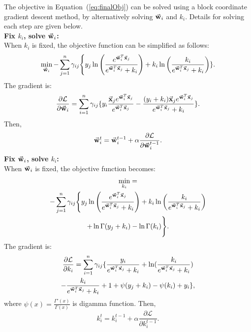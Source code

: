 The objective in Equation~(\ref{eq:finalObj}) can be solved using a block coordinate gradient descent method, by alternatively solving $\vec{\mathbf{w}}_i$ and $k_i$. Details for solving each step are given below.\\
\textbf{Fix $k_i$, solve $\vec{\mathbf{w}}_i$:}\\
When $k_i$ is fixed, the objective function can be simplified as follows:
\begin{multline}
	\min_{\vec{\mathbf{w}}_i}
	-\sum_{j=1}^n \gamma_{ij} \Bigg\{y_j \ln\left( \frac{e^{\vec{\mathbf{w}}_i^T \vec{\mathbf{x}}_j}}{e^{\vec{\mathbf{w}}_i^T \vec{\mathbf{x}}_j} + k_i}\right) + k_i \ln\left(\frac{k_i}{e^{\vec{\mathbf{w}}_i^T \vec{\mathbf{x}}_j} +k_i}\right) \}.
\end{multline}
The gradient is:
\begin{equation}
	\frac{\partial \mathcal{L}}{\partial \vec{\mathbf{w}}_i}=\sum_{i=1}^{n}\gamma_{ij}\{y_i\frac{\vec{\mathbf{x}}_je^{\vec{\mathbf{w}}_i^T\vec{\mathbf{x}}_j}}{e^{\vec{\mathbf{w}}_i^T\vec{\mathbf{x}}_j}}-\frac{(y_i+k_i)\vec{\mathbf{x}}_je^{\vec{\mathbf{w}}_i^T\vec{\mathbf{x}}_j}}{e^{\vec{\mathbf{w}}_i^T\vec{\mathbf{x}}_j}+k_i}\}.
\end{equation}
Then,
\begin{equation}
\vec{\mathbf{w}}_i^t=\vec{\mathbf{w}}_i^{t-1}+\alpha\frac{\partial \mathcal{L}}{\partial \vec{\mathbf{w}}_i^{t-1}}.
\end{equation}
\textbf{Fix $\vec{\mathbf{w}}_i$, solve $k_i$:}\\
When $\vec{\mathbf{w}}_i$ is fixed, the objective function becomes:
\begin{multline}
\min_{k_i} = \\
-\sum_{j=1}^n \gamma_{ij} \Bigg\{y_j \ln\left( \frac{e^{\vec{\mathbf{w}}_i^T \vec{\mathbf{x}}_j}}{e^{\vec{\mathbf{w}}_i^T \vec{\mathbf{x}}_j} + k_i}\right) + k_i \ln\left(\frac{k_i}{e^{\vec{\mathbf{w}}_i^T \vec{\mathbf{x}}_j} +k_i}\right) \\
+ \ln \Gamma(y_j + k_i ) - \ln \Gamma( k_i) \Bigg\}.
\end{multline}
The gradient is:
\begin{multline}
	\frac{\partial \mathcal{L}}{\partial k_i}=\sum_{i=1}^{n}\gamma_{ij}\{\frac{y_i}{e^{\vec{\mathbf{w}}_i^T\vec{\mathbf{x}}_j}+k_i}+\ln(\frac{k_i}{e^{\vec{\mathbf{w}}_i^T\vec{\mathbf{x}}_j}+k_i})\\-\frac{k_i}{e^{\vec{\mathbf{w}}_i^T\vec{\mathbf{x}}_j}+k_i}+1+\psi(y_j+k_i)-\psi(k_i)+y_i\},
\end{multline}
where $\psi(x)=\frac{\Gamma'(x)}{\Gamma(x)}$ is digamma function. Then,
\begin{equation}
k_i^t=k_i^{t-1}+\alpha\frac{\partial \mathcal{L}}{\partial k_i^{t-1}}.
\end{equation}
